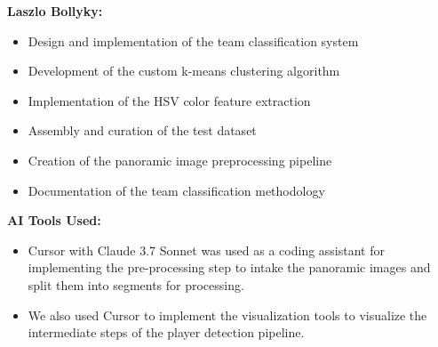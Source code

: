 \documentclass[10pt,twocolumn,letterpaper]{article}
\begin{document}
\textbf{Laszlo Bollyky:}
\begin{itemize}
    \item Design and implementation of the team classification system
    \item Development of the custom k-means clustering algorithm
    \item Implementation of the HSV color feature extraction
    \item Assembly and curation of the test dataset
    \item Creation of the panoramic image preprocessing pipeline
    \item Documentation of the team classification methodology
\end{itemize}


\textbf{AI Tools Used:}
\begin{itemize}
    \item Cursor with Claude 3.7 Sonnet was used as a coding assistant for implementing the pre-processing step to intake the panoramic images and split them into segments for processing. 
    \item We also used Cursor to implement the visualization tools to visualize the intermediate steps of the player detection pipeline.
\end{itemize}

{\small


}
\end{document}
